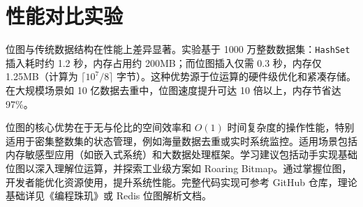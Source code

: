 \chapter{性能对比实验}
位图与传统数据结构在性能上差异显著。实验基于 1000 万整数数据集：\texttt{HashSet} 插入耗时约 1.2 秒，内存占用约 200MB；而位图插入仅需 0.3 秒，内存仅 1.25MB（计算为 $ \lceil 10^7 / 8 \rceil $ 字节）。这种优势源于位运算的硬件级优化和紧凑存储。在大规模场景如 10 亿数据去重中，位图速度提升可达 10 倍以上，内存节省达 97\%{}。\par
位图的核心优势在于无与伦比的空间效率和 $ O(1) $ 时间复杂度的操作性能，特别适用于密集整数集的状态管理，例如海量数据去重或实时系统监控。适用场景包括内存敏感型应用（如嵌入式系统）和大数据处理框架。学习建议包括动手实现基础位图以深入理解位运算，并探索工业级方案如 Roaring Bitmap。通过掌握位图，开发者能优化资源使用，提升系统性能。完整代码实现可参考 GitHub 仓库，理论基础详见《编程珠玑》或 Redis 位图解析文档。\par
